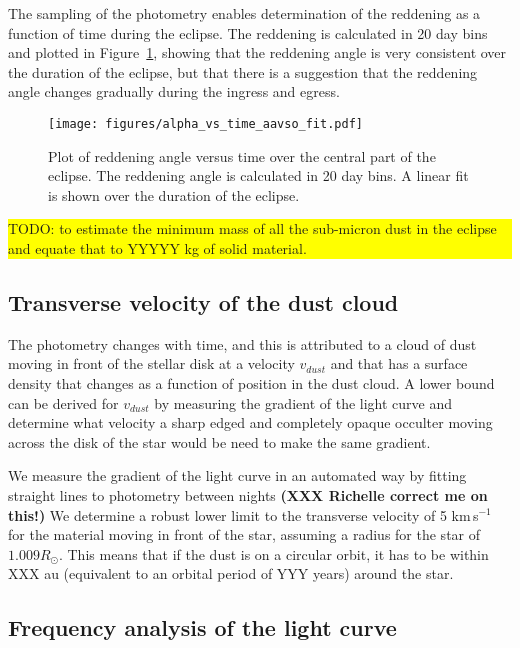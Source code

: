 \documentclass{aa}
\newcommand{\todo}[1]{
\colorbox{yellow}{
\begin{minipage}{0.8\linewidth}
\color{red}
TODO: #1
\end{minipage}
}}
\begin{document}
The sampling of the photometry enables determination of the reddening as a function of time during the eclipse.
%
The reddening is calculated in 20 day bins and plotted in Figure~\ref{fig:reddenanglevstime}, showing that the reddening angle is very consistent over the duration of the eclipse, but that there is a suggestion that the reddening angle changes gradually during the ingress and egress.


\begin{figure}
    \begin{centering}
        \texttt{[image: figures/alpha\_vs\_time\_aavso\_fit.pdf]}
\caption{Plot of reddening angle versus time over the central part of the eclipse. The reddening angle is calculated in 20 day bins. A linear fit is shown over the duration of the eclipse.}
        \label{fig:reddenanglevstime}
    \end{centering}
\end{figure}



\todo{to estimate the minimum mass of all the sub-micron dust in the eclipse and equate that to YYYYY kg of solid material.}

\subsection{Transverse velocity of the dust cloud}

The photometry changes with time, and this is attributed to a cloud of dust moving in front of the stellar disk at a velocity $v_{dust}$ and that has a surface density that changes as a function of position in the dust cloud.
%
A lower bound can be derived for $v_{dust}$ by measuring the gradient of the light curve and determine what velocity a sharp edged and completely opaque occulter moving across the disk of the star would be need to make the same gradient.

We measure the gradient of the light curve in an automated way by fitting straight lines to photometry between nights {\bf (XXX Richelle correct me on this!)}
%
We determine a robust lower limit to the transverse velocity of 5 km\,s$^{-1}$ for the material moving in front of the star, assuming a radius for the star of $1.009 R_\odot$.
%
This means that if the dust is on a circular orbit, it has to be within XXX au (equivalent to an orbital period of YYY years) around the star.



\subsection{Frequency analysis of the light curve}
\end{document}
